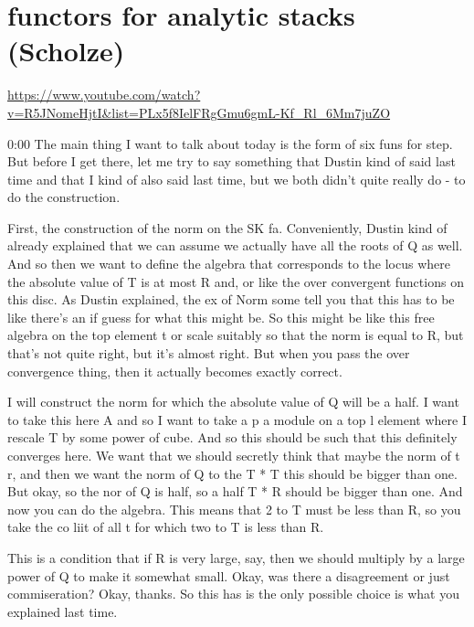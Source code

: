 
\section{ functors for analytic stacks (Scholze)}

\url{https://www.youtube.com/watch?v=R5JNomeHjtI&list=PLx5f8IelFRgGmu6gmL-Kf_Rl_6Mm7juZO}
\renewcommand{\yt}[2]{\href{https://www.youtube.com/watch?v=R5JNomeHjtI&list=PLx5f8IelFRgGmu6gmL-Kf_Rl_6Mm7juZO&t=#1}{#2}}
\vspace{1em}

\begin{unfinished}{0:00}
The main thing I want to talk about today is the form of six funs for step. But before I get there, let me try to say something that Dustin kind of said last time and that I kind of also said last time, but we both didn't quite really do - to do the construction.

First, the construction of the norm on the SK fa. Conveniently, Dustin kind of already explained that we can assume we actually have all the roots of Q as well. And so then we want to define the algebra that corresponds to the locus where the absolute value of T is at most R and, or like the over convergent functions on this disc. As Dustin explained, the ex of Norm some tell you that this has to be like there's an if guess for what this might be. So this might be like this free algebra on the top element t or scale suitably so that the norm is equal to R, but that's not quite right, but it's almost right. But when you pass the over convergence thing, then it actually becomes exactly correct.

I will construct the norm for which the absolute value of Q will be a half. I want to take this here A and so I want to take a p a module on a top l element where I rescale T by some power of cube. And so this should be such that this definitely converges here. We want that we should secretly think that maybe the norm of t r, and then we want the norm of Q to the T * T this should be bigger than one. But okay, so the nor of Q is half, so a half T * R should be bigger than one. And now you can do the algebra. This means that 2 to T must be less than R, so you take the co liit of all t for which two to T is less than R.

This is a condition that if R is very large, say, then we should multiply by a large power of Q to make it somewhat small. Okay, was there a disagreement or just commiseration? Okay, thanks. So this has is the only possible choice is what you explained last time.


\end{unfinished}
